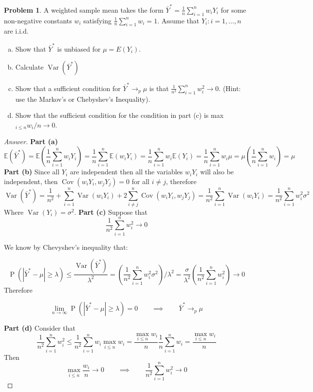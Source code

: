 \documentclass{article}
\theoremstyle{definition}
\newtheorem{problem}{Problem}
\newcommand{\qiq}{\qquad \implies \qquad}
\begin{document}
\begin{problem}
A weighted sample mean takes the form $\bar{Y}^{*}=\frac{1}{n} \sum_{i=1}^{n} w_{i} Y_{i}$ for some non-negative constants $w_{i}$ satisfying $\frac{1}{n} \sum_{i=1}^{n} w_{i}=1 .$ Assume that $Y_{i}: i=1, \ldots, n$ are i.i.d.
\begin{enumerate}[(a)]
    \item  Show that $\bar{Y}^{*}$ is unbiased for $\mu=E\left(Y_{i}\right)$.
    \item Calculate $\operatorname{Var}\left(\bar{Y}^{*}\right)$
    \item Show that a sufficient condition for $\bar{Y}^{*} \rightarrow_{p} \mu$ is that $\frac{1}{n^{2}} \sum_{i=1}^{n} w_{i}^{2} \rightarrow 0 .$ (Hint: use the Markov's or Chebyshev's Inequality).
    \item Show that the sufficient condition for the condition in part (c) is max $_{i \leq n} w_{i} / n \rightarrow 0$.
\end{enumerate}
\end{problem}

\begin{proof}[Answer]
\textbf{Part (a)}
$$\mathbb{E}\left(\bar{Y}^{*}\right)=\mathbb{E}\left(\frac{1}{n} \sum_{i=1}^{n} w_{i} Y_{i}\right)=\frac{1}{n} \sum_{i=1}^{n}\mathbb{E}\left( w_{i} Y_{i}\right)=\frac{1}{n} \sum_{i=1}^{n}w_{i} \mathbb{E}\left( Y_{i}\right) = \frac{1}{n} \sum_{i=1}^{n}w_{i} \mu = \mu\left(\frac{1}{n} \sum_{i=1}^{n}w_{i}\right)=\mu$$
\textbf{Part (b)} Since all $Y_i$ are independent then all the variables $w_iY_i$ will also be independent, then $\operatorname{Cov}(w_iY_i,w_jY_j)=0$ for all $i\neq j$, therefore 
$$\operatorname{Var}(\bar{Y}^{*})= \frac{1}{n^2}+\sum_{i=1}^n\operatorname{Var}(w_i Y_i) + 2\sum_{i\neq j}^n\operatorname{Cov}(w_iY_i, w_jY_j) = \frac{1}{n^2}\sum_{i=1}^n\operatorname{Var}(w_iY_i) = \frac{1}{n^2}\sum_{i=1}^n w_i^2 \sigma^2$$
Where $\operatorname{Var}(Y_i)=\sigma^2$.
\textbf{Part (c)}
Suppose that 
$$\frac{1}{n^{2}} \sum_{i=1}^{n} w_{i}^{2} \rightarrow 0$$

We know by Chevyshev's inequality that:

$$\operatorname{P}(|\bar{Y}^{*}-\mu| \geq \lambda) \leq \frac{\operatorname{Var}(\bar{Y}^{*})}{\lambda^{2}} =  \left(\frac{1}{n^2}\sum_{i=1}^n w_i^2 \sigma^2\right)\big/\lambda ^2 = \frac{\sigma}{\lambda^2}\left(\frac{1}{n^2}\sum_{i=1}^n w_i^2\right) \to  0$$
Therefore

$$\lim_{n\to \infty}\operatorname{P}(|\bar{Y}^{*}-\mu| \geq \lambda) = 0 \qiq \bar{Y}^{*}\to_p\mu$$

\textbf{Part (d)}
Consider that 
$$\frac{1}{n^{2}} \sum_{i=1}^{n} w_{i}^{2} \leq \frac{1}{n^{2}} \sum_{i=1}^{n} w_{i} \max _{i \leq n} w_{i}=\frac{\max _{i \leq n} w_{i}}{n} \frac{1}{n} \sum_{i=1}^{n} w_{i}=\frac{\max _{i \leq n} w_{i}}{n}$$
Then 
$$\max _{i \leq n}\frac{w_{i}}{ n }\rightarrow 0 \qiq \frac{1}{n^{2}} \sum_{i=1}^{n} w_{i}^{2} \rightarrow 0$$
\end{proof}
\end{document}
